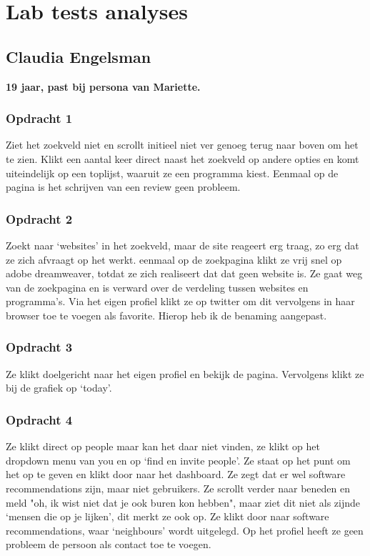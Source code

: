 \chapter{Lab tests analyses}
    \label{labtestsappendix}

\section{Claudia Engelsman}
\textbf{19 jaar, past bij persona van Mariette.}

\subsection{Opdracht 1}
  Ziet het zoekveld niet en scrollt initieel niet ver genoeg terug naar boven om het te zien. Klikt een aantal keer direct naast het zoekveld op andere opties en komt uiteindelijk op een toplijst, waaruit ze een programma kiest. Eenmaal op de pagina is het schrijven van een review geen probleem.

\subsection{Opdracht 2}
  Zoekt naar `websites' in het zoekveld, maar de site reageert erg traag, zo erg dat ze zich afvraagt op het werkt. eenmaal op de zoekpagina klikt ze vrij snel op adobe dreamweaver, totdat ze zich realiseert dat dat geen website is. Ze gaat weg van de zoekpagina en is verward over de verdeling tussen websites en programma's. Via het eigen profiel klikt ze op twitter om dit vervolgens in haar browser toe te voegen als favorite. Hierop heb ik de benaming aangepast.

\subsection{Opdracht 3}
  Ze klikt doelgericht naar het eigen profiel en bekijk de pagina. Vervolgens klikt ze bij de grafiek op `today'.

\subsection{Opdracht 4}
 Ze klikt direct op people maar kan het daar niet vinden, ze klikt op het dropdown menu van you en op `find en invite people'. Ze staat op het punt om het op te geven en klikt door naar het dashboard. Ze zegt dat er wel software recommendations zijn, maar niet gebruikers. Ze scrollt verder naar beneden en meld "oh, ik wist niet dat je ook buren kon hebben", maar ziet dit niet als zijnde `mensen die op je lijken', dit merkt ze ook op. Ze klikt door naar software recommendations, waar `neighbours' wordt uitgelegd. Op het profiel heeft ze geen probleem de persoon als contact toe te voegen.

